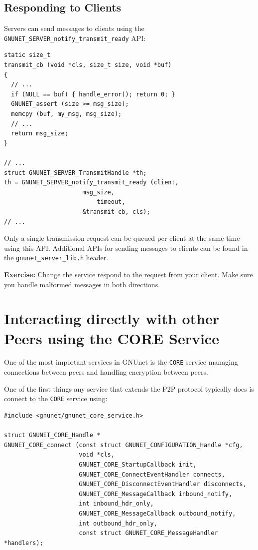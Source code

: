 \documentclass[10pt]{article}
\newcommand{\exercise}[1]{\noindent\begin{boxedminipage}{\textwidth}{\bf Exercise:} #1 \end{boxedminipage}}
\begin{document}
\subsection{Responding to Clients}

Servers can send messages to clients using the
{\tt GNUNET\_SERVER\_notify\_transmit\_ready} API:

\lstset{language=c}
\begin{lstlisting}
static size_t
transmit_cb (void *cls, size_t size, void *buf)
{
  // ...
  if (NULL == buf) { handle_error(); return 0; }
  GNUNET_assert (size >= msg_size);
  memcpy (buf, my_msg, msg_size);
  // ...
  return msg_size;
}

// ...
struct GNUNET_SERVER_TransmitHandle *th;
th = GNUNET_SERVER_notify_transmit_ready (client,
					  msg_size,
 				          timeout,
					  &transmit_cb, cls);
// ...
\end{lstlisting}

Only a single transmission request can be queued per client
at the same time using this API.
Additional APIs for sending messages to clients can be found
in the {\tt gnunet\_server\_lib.h} header.


\exercise{Change the service respond to the request from your
client.  Make sure you handle malformed messages in both directions.}

\section{Interacting directly with other Peers using the CORE Service}

One of the most important services in GNUnet is the \texttt{CORE} service
managing connections between peers and handling encryption between peers.

One of the first things any service that extends the P2P protocol typically does
is connect to the \texttt{CORE} service using:

\lstset{language=C}
\begin{lstlisting}
#include <gnunet/gnunet_core_service.h>

struct GNUNET_CORE_Handle *
GNUNET_CORE_connect (const struct GNUNET_CONFIGURATION_Handle *cfg,
                     void *cls,
                     GNUNET_CORE_StartupCallback init,
                     GNUNET_CORE_ConnectEventHandler connects,
                     GNUNET_CORE_DisconnectEventHandler disconnects,
                     GNUNET_CORE_MessageCallback inbound_notify,
                     int inbound_hdr_only,
                     GNUNET_CORE_MessageCallback outbound_notify,
                     int outbound_hdr_only,
                     const struct GNUNET_CORE_MessageHandler *handlers);
\end{lstlisting}
\end{document}
